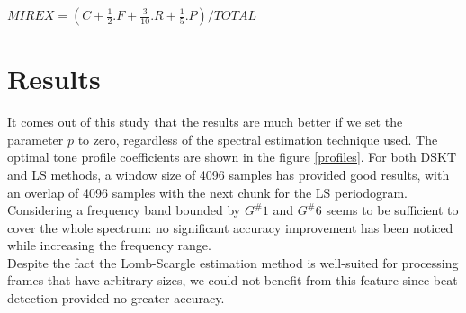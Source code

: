 \documentclass[letterpaper]{article}
\begin{document}
\noindent $ MIREX = (C + \frac{1}{2}.F + \frac{3}{10}.R + \frac{1}{5}.P) / TOTAL $

\section{Results}

It comes out of this study that the results are much better if we set the parameter $p$ to zero, regardless of the spectral estimation technique used.
The optimal tone profile coefficients are shown in the figure \ref{profiles}. For both DSKT and LS methods, a window size of 4096 samples has provided good results, with an overlap of 4096 samples with the next chunk for the LS periodogram.
Considering a frequency band bounded by $G^{\#}1$ and $G^{\#}6$ seems to be sufficient to cover the whole spectrum: no significant accuracy improvement has been noticed while increasing the frequency range.\\

Despite the fact the Lomb-Scargle estimation method is well-suited for processing frames that have arbitrary sizes, we could not benefit from this feature since beat detection provided no greater accuracy.

\begin{table}
\vskip 0.25cm
\caption{Accuracy assessment, according to the raw accuracy and the MIREX index}
\end{table}

\begin{table}
\vskip 0.25cm
\caption{Scores obtained using Lomb-Scargle + MKC, based on the temporal window size}
\end{table}
\end{document}
